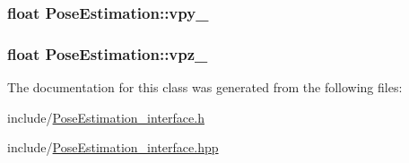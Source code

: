 \hypertarget{classPoseEstimation_a1511fe49165c547efae9bed1b2353d07}{
\subsubsection[{vpy\-\_\-}]{\setlength{\rightskip}{0pt plus 5cm}float Pose\-Estimation\-::vpy\-\_\-\hspace{0.3cm}{\ttfamily [private]}}}\label{classPoseEstimation_a1511fe49165c547efae9bed1b2353d07}
\hypertarget{classPoseEstimation_a49696bc81ba72d1b0e985aa8318b0a82}{
\subsubsection[{vpz\-\_\-}]{\setlength{\rightskip}{0pt plus 5cm}float Pose\-Estimation\-::vpz\-\_\-\hspace{0.3cm}{\ttfamily [private]}}}\label{classPoseEstimation_a49696bc81ba72d1b0e985aa8318b0a82}


The documentation for this class was generated from the following files\-:\begin{DoxyCompactItemize}
\item 
include/\hyperlink{PoseEstimation__interface_8h}{Pose\-Estimation\-\_\-interface.\-h}\item 
include/\hyperlink{PoseEstimation__interface_8hpp}{Pose\-Estimation\-\_\-interface.\-hpp}\end{DoxyCompactItemize}
